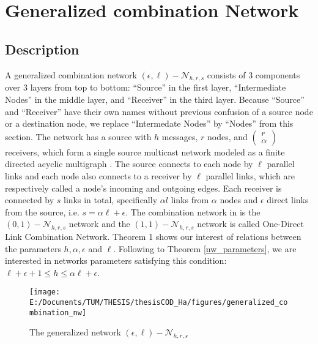 \chapter{Generalized combination Network} \label{chap:general_network}

\section{Description \label{sec:Description_GCN}}

A generalized combination network $(\epsilon,\ell)-\mathcal{N}_{h,r,s}$
consists of 3 components over 3 layers from top to bottom: ``Source''
in the first layer, ``Intermediate Nodes'' in the middle layer,
and ``Receiver'' in the third layer. Because ``Source'' and ``Receiver''
have their own names without previous confusion of a source node or
a destination node, we replace ``Intermedate Nodes'' by ``Nodes''
from this section. The network has a source with $h$ messages, $r$
nodes, and $\left(\begin{array}{c}
r\\
\alpha
\end{array}\right)$ receivers, which form a single source multicast network modeled as
a finite directed acyclic multigraph \cite{Li:2003}. The source connects
to each node by $\ell$ parallel links and each node also connects
to a receiver by $\ell$ parallel links, which are respectively called
a node's incoming and outgoing edges. Each receiver is connected by
$s$ links in total, specifically $\alpha l$ links from $\alpha$
nodes and $\epsilon$ direct links from the source, i.e. $s=\alpha\ell+\epsilon$.
The combination network in \cite{Riis:2006} is the $(0,1)-\mathcal{N}_{h,r,s}$
network and the $(1,1)-\mathcal{N}_{h,r,s}$ network is called One-Direct
Link Combination Network. Theorem 1 shows our interest of relations
between the parameters $h,\alpha,\epsilon$ and $\ell$. Following
to Theorem \ref{nw_parameters}, we are interested in networks parameters
satisfying this condition: $\ell+\epsilon+1\leq h\leq\alpha\ell+\epsilon$.
\begin{figure}[H]
\caption{The generalized network $(\epsilon,\ell)-\mathcal{N}_{h,r,s}$\label{fig:The-generalized-network}}

\centering{}\texttt{[image: E:/Documents/TUM/THESIS/thesisCOD\_Ha/figures/generalized\_combination\_nw]}
\end{figure}

